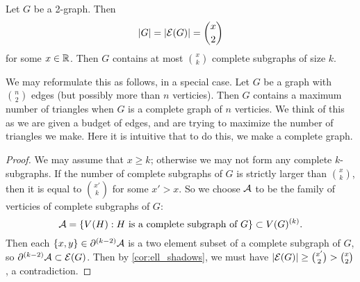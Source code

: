 \begin{corollary}
Let $G$ be a 2-graph. Then 
\[
|G| = |\mathcal{E} (G)| = {x\choose 2}
\]
for some $x\in \mathbb{R}$. Then $G$ contains at most ${x\choose k}$ complete subgraphs of size $k$.
\end{corollary}
\begin{remark}
We may reformulate this as follows, in a special case. Let $G$ be a graph with ${n\choose 2}$ edges (but possibly more than $n$ verticies). Then $G$ contains a maximum number of triangles when $G$ is a complete graph of $n$ verticies. We think of this as we are given a budget of edges, and are trying to maximize the number of triangles we make. Here it is intuitive that to do this, we make a complete graph.
\end{remark}
\begin{proof}	
We may assume that $x\geq k$; otherwise we may not form any complete $k$-subgraphs. If the number of complete subgraphs of $G$ is strictly larger than ${x\choose k}$, then it is equal to ${x' \choose k}$ for some $x' > x$. So we choose $\mathcal{A}$ to be the family of verticies of complete subgraphs of $G$: 
\[
\mathcal{A} = \{V(H): H \text{ is a complete subgraph of }G\} \subset V(G)^{(k)}.
\] Then each $\{x,y\} \in \partial^{(k-2)} \mathcal{A}$ is a two element subset of a complete subgraph of $G$,  so $\partial^{(k-2)} \mathcal{A}\subset \mathcal{E}(G)$. Then by \cref{cor:ell_shadows}, we must have $|\mathcal{E} (G)| \geq {x'\choose 2} > {x\choose 2}$, a contradiction.
\end{proof}